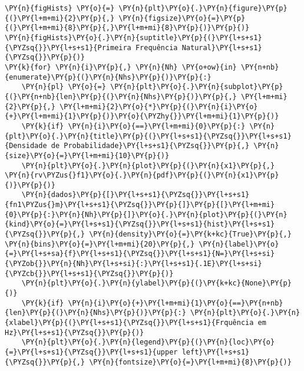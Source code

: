 \begin{tcolorbox}[breakable, size=fbox, boxrule=1pt, pad at break*=1mm,colback=cellbackground, colframe=cellborder]
\begin{Verbatim}[commandchars=\\\{\}]
\PY{n}{figHists} \PY{o}{=} \PY{n}{plt}\PY{o}{.}\PY{n}{figure}\PY{p}{(}\PY{l+m+mi}{2}\PY{p}{,} \PY{n}{figsize}\PY{o}{=}\PY{p}{(}\PY{l+m+mi}{8}\PY{p}{,}\PY{l+m+mi}{8}\PY{p}{)}\PY{p}{)}
\PY{n}{figHists}\PY{o}{.}\PY{n}{suptitle}\PY{p}{(}\PY{l+s+s1}{\PYZsq{}}\PY{l+s+s1}{Primeira Frequência Natural}\PY{l+s+s1}{\PYZsq{}}\PY{p}{)}
\PY{k}{for} \PY{n}{i}\PY{p}{,} \PY{n}{Nh} \PY{o+ow}{in} \PY{n+nb}{enumerate}\PY{p}{(}\PY{n}{Nhs}\PY{p}{)}\PY{p}{:}
    \PY{n}{pl} \PY{o}{=} \PY{n}{plt}\PY{o}{.}\PY{n}{subplot}\PY{p}{(}\PY{n+nb}{len}\PY{p}{(}\PY{n}{Nhs}\PY{p}{)}\PY{p}{,} \PY{l+m+mi}{2}\PY{p}{,} \PY{l+m+mi}{2}\PY{o}{*}\PY{p}{(}\PY{n}{i}\PY{o}{+}\PY{l+m+mi}{1}\PY{p}{)}\PY{o}{\PYZhy{}}\PY{l+m+mi}{1}\PY{p}{)}
    \PY{k}{if} \PY{n}{i}\PY{o}{==}\PY{l+m+mi}{0}\PY{p}{:} \PY{n}{plt}\PY{o}{.}\PY{n}{title}\PY{p}{(}\PY{l+s+s1}{\PYZsq{}}\PY{l+s+s1}{Densidade de Probabilidade}\PY{l+s+s1}{\PYZsq{}}\PY{p}{,} \PY{n}{size}\PY{o}{=}\PY{l+m+mi}{10}\PY{p}{)}
    \PY{n}{plt}\PY{o}{.}\PY{n}{plot}\PY{p}{(}\PY{n}{x1}\PY{p}{,} \PY{n}{rv\PYZus{}f1}\PY{o}{.}\PY{n}{pdf}\PY{p}{(}\PY{n}{x1}\PY{p}{)}\PY{p}{)}
    \PY{n}{dados}\PY{p}{[}\PY{l+s+s1}{\PYZsq{}}\PY{l+s+s1}{fn1\PYZus{}m}\PY{l+s+s1}{\PYZsq{}}\PY{p}{]}\PY{p}{[}\PY{l+m+mi}{0}\PY{p}{:}\PY{n}{Nh}\PY{p}{]}\PY{o}{.}\PY{n}{plot}\PY{p}{(}\PY{n}{kind}\PY{o}{=}\PY{l+s+s1}{\PYZsq{}}\PY{l+s+s1}{hist}\PY{l+s+s1}{\PYZsq{}}\PY{p}{,} \PY{n}{density}\PY{o}{=}\PY{k+kc}{True}\PY{p}{,} \PY{n}{bins}\PY{o}{=}\PY{l+m+mi}{20}\PY{p}{,} \PY{n}{label}\PY{o}{=}\PY{l+s+sa}{f}\PY{l+s+s1}{\PYZsq{}}\PY{l+s+s1}{N=}\PY{l+s+si}{\PYZob{}}\PY{n}{Nh}\PY{l+s+si}{:}\PY{l+s+s1}{.1E}\PY{l+s+si}{\PYZcb{}}\PY{l+s+s1}{\PYZsq{}}\PY{p}{)}
    \PY{n}{plt}\PY{o}{.}\PY{n}{ylabel}\PY{p}{(}\PY{k+kc}{None}\PY{p}{)}
    \PY{k}{if} \PY{n}{i}\PY{o}{+}\PY{l+m+mi}{1}\PY{o}{==}\PY{n+nb}{len}\PY{p}{(}\PY{n}{Nhs}\PY{p}{)}\PY{p}{:} \PY{n}{plt}\PY{o}{.}\PY{n}{xlabel}\PY{p}{(}\PY{l+s+s1}{\PYZsq{}}\PY{l+s+s1}{Frquência em Hz}\PY{l+s+s1}{\PYZsq{}}\PY{p}{)}
    \PY{n}{plt}\PY{o}{.}\PY{n}{legend}\PY{p}{(}\PY{n}{loc}\PY{o}{=}\PY{l+s+s1}{\PYZsq{}}\PY{l+s+s1}{upper left}\PY{l+s+s1}{\PYZsq{}}\PY{p}{,} \PY{n}{fontsize}\PY{o}{=}\PY{l+m+mi}{8}\PY{p}{)}


\end{Verbatim}
\end{tcolorbox}
